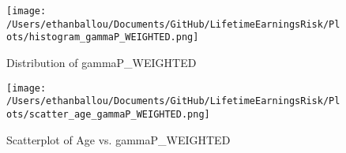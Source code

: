 \documentclass[12pt]{article}
\begin{document}


























\vspace{4cm}


\begin{figure}[H]
    \centering
    \texttt{[image: /Users/ethanballou/Documents/GitHub/LifetimeEarningsRisk/Plots/histogram\_gammaP\_WEIGHTED.png]}
    \caption{Distribution of gammaP\_WEIGHTED}
\end{figure}



\begin{figure}[H]
    \centering
    \texttt{[image: /Users/ethanballou/Documents/GitHub/LifetimeEarningsRisk/Plots/scatter\_age\_gammaP\_WEIGHTED.png]}
    \caption{Scatterplot of Age vs. gammaP\_WEIGHTED}
\end{figure}
\end{document}
